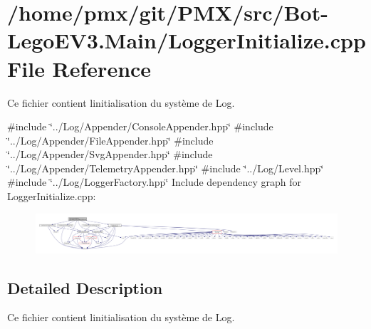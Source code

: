 \hypertarget{src_2Bot-LegoEV3_8Main_2LoggerInitialize_8cpp}{}\section{/home/pmx/git/\+P\+M\+X/src/\+Bot-\/\+Lego\+E\+V3.Main/\+Logger\+Initialize.cpp File Reference}
\label{src_2Bot-LegoEV3_8Main_2LoggerInitialize_8cpp}


Ce fichier contient l\textquotesingle{}initialisation du système de Log.  


{\ttfamily \#include \char`\"{}../\+Log/\+Appender/\+Console\+Appender.\+hpp\char`\"{}}\newline
{\ttfamily \#include \char`\"{}../\+Log/\+Appender/\+File\+Appender.\+hpp\char`\"{}}\newline
{\ttfamily \#include \char`\"{}../\+Log/\+Appender/\+Svg\+Appender.\+hpp\char`\"{}}\newline
{\ttfamily \#include \char`\"{}../\+Log/\+Appender/\+Telemetry\+Appender.\+hpp\char`\"{}}\newline
{\ttfamily \#include \char`\"{}../\+Log/\+Level.\+hpp\char`\"{}}\newline
{\ttfamily \#include \char`\"{}../\+Log/\+Logger\+Factory.\+hpp\char`\"{}}\newline
Include dependency graph for Logger\+Initialize.\+cpp\+:
\nopagebreak
\begin{figure}[H]
\begin{center}
\leavevmode
\includegraphics[width=350pt]{src_2Bot-LegoEV3_8Main_2LoggerInitialize_8cpp__incl}
\end{center}
\end{figure}


\subsection{Detailed Description}
Ce fichier contient l\textquotesingle{}initialisation du système de Log. 

